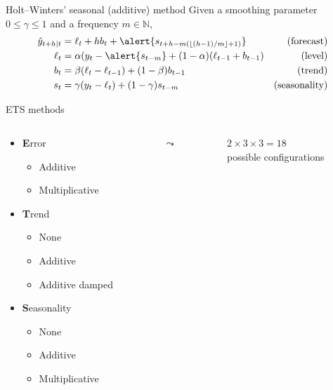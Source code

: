 \documentclass[12pt,aspectratio=169]{beamer}
\newcommand{\N}{\ensuremath{\mathbb{N}}}
\begin{document}
\begin{frame}{Holt--Winters' seasonal (additive) method}
    Given a smoothing parameter $0 \leq \gamma \leq 1$ and a frequency $m \in \N$,
    \begin{align*}
        \hat{y}_{t + h | t} &= \ell_{t} + h b_{t} + \alert{s_{t+h-m(\lfloor (h-1)/m \rfloor+1)}}     & \text{(forecast)} \\
        \ell_{t}            &= \alpha (y_{t} - \alert{s_{t-m}} + (1 - \alpha) (\ell_{t-1} + b_{t-1}) & \text{(level)} \\
        b_{t}               &= \beta (\ell_{t} - \ell_{t-1}) + (1 - \beta) b_{t-1}                   & \text{(trend)} \\
        s_{t}               &= \gamma (y_{t} - \ell_{t}) + (1 - \gamma) s_{t-m}                      & \text{(seasonality)}
    \end{align*}
\end{frame}

\begin{frame}{ETS methods}
    \begin{columns}
        \begin{column}{0.475\textwidth}
            \begin{itemize}
                \item \alert{\textbf{E}rror}
                      \begin{itemize}
                          \item Additive
                          \item Multiplicative
                      \end{itemize}
                \item \textbf{T}rend
                      \begin{itemize}
                          \item None
                          \item Additive
                          \item Additive damped
                      \end{itemize}
                \item \textbf{S}easonality
                      \begin{itemize}
                          \item None
                          \item Additive
                          \item Multiplicative
                      \end{itemize}
            \end{itemize}
        \end{column}
        \begin{column}{0.05\textwidth}
            $\leadsto$
        \end{column}
        \begin{column}{0.475\textwidth}
            \centering%
            $2 \times 3 \times 3 = 18$ \\
            possible configurations
        \end{column}
    \end{columns}
\end{frame}
\end{document}
